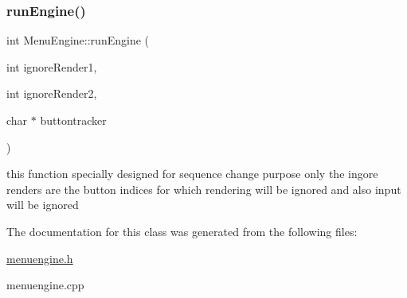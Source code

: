 \subsubsection{\texorpdfstring{run\+Engine()}{runEngine()}\hspace{0.1cm}{\footnotesize\ttfamily [2/2]}}
{\footnotesize\ttfamily int Menu\+Engine\+::run\+Engine (\begin{DoxyParamCaption}\item[{int}]{ignore\+Render1,  }\item[{int}]{ignore\+Render2,  }\item[{char $\ast$}]{buttontracker }\end{DoxyParamCaption})}

this function specially designed for sequence change purpose only the ingore renders are the button indices for which rendering will be ignored and also input will be ignored 

The documentation for this class was generated from the following files\+:\begin{DoxyCompactItemize}
\item 
\hyperlink{menuengine_8h}{menuengine.\+h}\item 
menuengine.\+cpp\end{DoxyCompactItemize}
